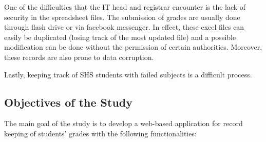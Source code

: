 \documentclass[11pt,a4paper,titlepage]{article}
\begin{document}
One of the difficulties that the IT head and registrar encounter is the lack of security in the spreadsheet files. The submission of grades are usually done through flash drive or via facebook messenger. In effect, these excel files can easily be duplicated (losing track of the most updated file) and a possible modification can be done without the permission of certain authorities. Moreover, these records are also prone to data corruption.

Lastly, keeping track of SHS students with failed subjects is a difficult process.  




\subsection{Objectives of the Study}
The main goal of the study is to develop a web-based application for record keeping of students' grades with the following functionalities:
\end{document}
